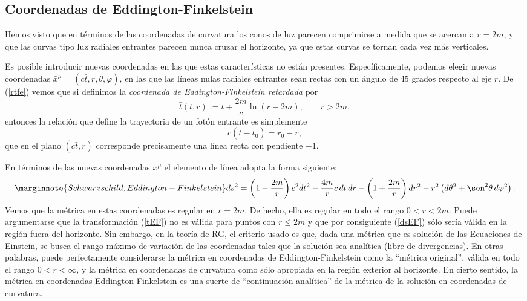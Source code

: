 \subsection{Coordenadas de Eddington-Finkelstein}

Hemos visto que en términos de las coordenadas de curvatura los conos de luz parecen comprimirse a medida que se acercan a $r=2m$, y que las curvas tipo luz radiales entrantes parecen nunca cruzar el horizonte, ya que estas curvas se tornan cada vez más verticales.

Es posible introducir nuevas coordenadas en las que estas características no están presentes. Específicamente, podemos elegir nuevas coordenadas $\bar{x}^\mu=(c\bar{t},r,\theta,\varphi)$, en las que las líneas nulas radiales entrantes sean rectas con un ángulo de 45 grados respecto al eje $r$. De (\ref{rtfe}) vemos que si definimos la \textit{coordenada de Eddington-Finkelstein retardada} por
\begin{equation}
 \bar{t}(t,r):=t+\frac{2m}{c}\ln\left(r-2m\right), \qquad r>2m, \label{tEF}
\end{equation}
entonces la relación que define la trayectoria de un fotón entrante es simplemente
\begin{equation}
 c(\bar{t}-\bar{t}_0)=r_0-r,
\end{equation}
que en el plano $(c\bar{t},r)$  corresponde precisamente una línea recta con pendiente $-1$.

En términos de las nuevas coordenadas $\bar{x}^\mu$ el elemento de línea adopta la forma siguiente:
\begin{equation}\marginnote{Schwarzschild, Eddington-Finkelstein}
 ds^2=\left(1-\frac{2m}{r}\right)c^2d\bar{t}^2-\frac{4m}{r}c\,d\bar{t}\,dr-\left(1+\frac{2m}{r}\right)dr^2-r^2\left(d\theta^2+\sen^2\theta\,d\varphi^2\right). \label{dsEF}
\end{equation}
Vemos que la métrica en estas coordenadas es regular en $r=2m$. De hecho, ella es regular en todo el rango $0<r<2m$. Puede argumentarse que la transformación (\ref{tEF}) no es válida para puntos con $r\le 2m$ y que por consiguiente (\ref{dsEF}) sólo sería válida en la región fuera del horizonte. Sin embargo, en la teoría de RG, el criterio usado es que, dada una métrica que es solución de las Ecuaciones de Einstein, se busca el rango máximo de variación de las coordenadas tales que la solución sea analítica (libre de divergencias). En otras palabras, puede perfectamente considerarse la métrica en coordenadas de Eddington-Finkelstein como la ``métrica original'', válida en todo el rango $0<r<\infty$, y la métrica en coordenadas de curvatura como sólo apropiada en la región exterior al horizonte. En cierto sentido, la métrica en coordenadas Eddington-Finkelstein es una suerte de ``continuación analítica'' de la métrica de la solución en coordenadas de curvatura.

